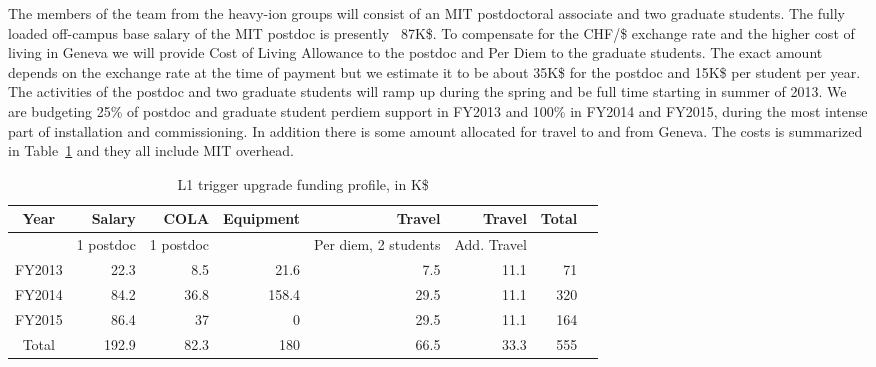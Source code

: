 The members of the team from the heavy-ion groups will consist of an MIT postdoctoral associate and two graduate students. The fully loaded off-campus base salary of the MIT postdoc is presently ~87K\$. To compensate for the CHF/\$ exchange rate and the higher cost of living in Geneva we will provide Cost of Living Allowance to the postdoc and Per Diem to the graduate students. The exact amount depends on the exchange rate at the time of payment but we estimate it to be about 35K\$ for the postdoc and 15K\$ per student per year.  The activities of the postdoc and two graduate students will ramp up during the spring and be full time starting in summer of 2013. We are budgeting 25\% of postdoc and graduate student perdiem support in FY2013 and 100\% in FY2014 and FY2015, during the most intense part of installation and commissioning. In addition there is some amount allocated for travel to and from Geneva. The costs is summarized in Table~\ref{OpCost} and they all include MIT overhead.

\begin{table}[hbt]
\begin{center}
\begin{tabular}{|c|r|r|r|r|r|r|r|}
\hline
Year        & Salary & COLA & Equipment & Travel & Travel& Total \\ \hline
            &  1 postdoc   & 1 postdoc   &  & Per diem, 2 students       &  Add. Travel     &     \\ \hline
FY2013      &   22.3   & 8.5   & 21.6      & 7.5  &  11.1     & 71    \\ \hline
FY2014      &   84.2   & 36.8  & 158.4     & 29.5 &  11.1     & 320  \\ \hline
FY2015      &   86.4   & 37    & 0         & 29.5 &  11.1     & 164   \\ \hline
Total       &   192.9     & 82.3   & 180       & 66.5 &  33.3    & 555   \\ \hline
\end{tabular}
\end{center}
\caption{L1 trigger upgrade funding profile, in K\$}
\label{OpCost}
\end{table}
